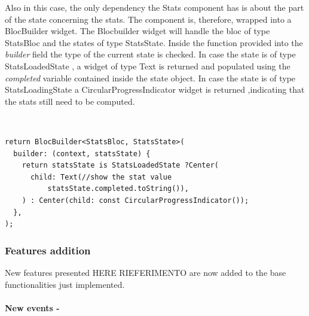 Also in this case, the only dependency the Stats component has is about the part of the state concerning the stats. The component is, therefore, wrapped into a BlocBuilder widget. The Blocbuilder widget will handle the bloc of type StatsBloc and the states of type StatsState. Inside the function provided into the \textit{builder} field the type of the current state is checked. In case the state is of type StatsLoadedState , a widget of type Text is returned and populated using the \textit{completed} variable contained inside the state object. In case the state is of type StatsLoadingState a CircularProgressIndicator widget is returned ,indicating that the stats still need to be computed.
\begin{code}
\mbox{}\\
 \mbox{}
\label{code:2.14}
\begin{verbatim}
return BlocBuilder<StatsBloc, StatsState>(
  builder: (context, statsState) {
    return statsState is StatsLoadedState ?Center(
      child: Text(//show the stat value
          statsState.completed.toString()),
    ) : Center(child: const CircularProgressIndicator());
  },
);
\end{verbatim}
\mbox{}
\end{code}

\subsubsection{Features addition}  \label{par:todo_app_inherited_widget_introduction}
New features presented HERE RIEFERIMENTO are now added  to the base functionalities just implemented.

\paragraph{New events - }
\label{subpar:todo_app_bloc_core_state}

